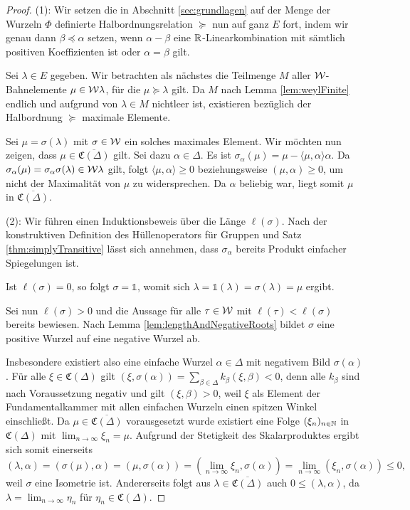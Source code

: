 \begin{proof}
  (1):
  Wir setzen die in Abschnitt \ref{sec:grundlagen} auf der Menge der Wurzeln $\Phi$ definierte Halb\-ordnungsrelation $\succeq$ nun auf ganz $E$ fort, indem wir genau dann $\beta \preceq \alpha$ setzen, wenn $\alpha - \beta$ eine $\mathbb{R}$-Linearkombination mit sämtlich positiven Koeffizienten ist oder $\alpha = \beta$ gilt.

  Sei $\lambda \in E$ gegeben. 
  Wir betrachten als nächstes die Teilmenge $M$ aller $\mathcal{W}$\hyp{}Bahnelemente $\mu \in \mathcal{W}\lambda$, für die $\mu \succeq \lambda$ gilt.
  Da $M$ nach Lemma \ref{lem:weylFinite} endlich und aufgrund von $\lambda \in M$ nichtleer ist, existieren bezüglich der Halbordnung $\succeq$ maximale Elemente.

  Sei $\mu = \sigma(\lambda)$ mit $\sigma \in \mathcal{W}$ ein solches maximales Element.
  Wir möchten nun zeigen, dass $\mu \in \overline{\mathfrak{C}(\Delta)}$ gilt.
  Sei dazu $\alpha \in \Delta$.
  Es ist $\sigma_\alpha(\mu) = \mu - \langle \mu, \alpha \rangle \alpha$.
  Da $\sigma_\alpha(\mu) = \sigma_\alpha \sigma (\lambda) \in \mathcal{W}\lambda$ gilt, folgt $\langle \mu, \alpha \rangle \geq 0$ beziehungsweise $(\mu,\alpha) \geq 0$, um nicht der Maximalität von $\mu$ zu widersprechen.
  Da $\alpha$ beliebig war, liegt somit $\mu$ in $\overline{\mathfrak{C}(\Delta)}$.

  (2):
  Wir führen einen Induktionsbeweis über die Länge $\ell(\sigma)$.
  Nach der konstruktiven Definition des Hüllenoperators für Gruppen und Satz \ref{thm:simplyTransitive} lässt sich annehmen, dass $\sigma_\alpha$ bereits Produkt einfacher Spiegelungen ist.

  Ist $\ell(\sigma) = 0$, so folgt $\sigma = \mathds{1}$, womit sich $\lambda = \mathds{1}(\lambda) = \sigma(\lambda) = \mu$ ergibt.

  Sei nun $\ell(\sigma) > 0$ und die Aussage für alle $\tau \in \mathcal{W}$ mit $\ell(\tau) < \ell(\sigma)$ bereits bewiesen.
  Nach Lemma \ref{lem:lengthAndNegativeRoots} bildet $\sigma$ eine positive Wurzel auf eine negative Wurzel ab.
  
  Insbesondere existiert also eine einfache Wurzel $\alpha \in \Delta$ mit negativem Bild $\sigma(\alpha)$.
  Für alle $\xi \in \mathfrak{C}(\Delta)$ gilt $(\xi, \sigma(\alpha)) = \sum_{\beta \in \Delta} k_\beta (\xi,\beta) < 0$, denn alle $k_\beta$ sind nach Voraussetzung negativ und gilt $(\xi,\beta) > 0$, weil $\xi$ als Element der Fundamentalkammer mit allen einfachen Wurzeln einen spitzen Winkel einschließt.
  Da $\mu \in \overline{\mathfrak{C}(\Delta)}$ vorausgesetzt wurde existiert eine Folge $(\xi_n)_{n \in \mathbb{N}}$ in $\mathfrak{C}(\Delta)$ mit $\lim_{n \to \infty} \xi_n = \mu$.
  Aufgrund der Stetigkeit des Skalarproduktes ergibt sich somit einerseits
  \begin{displaymath}
    (\lambda,\alpha)
    = (\sigma(\mu),\alpha)
    = (\mu, \sigma(\alpha)) 
    = (\lim_{n \to \infty} \xi_n, \sigma(\alpha)) 
    = \lim_{n \to \infty} ( \xi_n, \sigma(\alpha)) \leq 0,
  \end{displaymath}
  weil $\sigma$ eine Isometrie ist.
  Andererseits folgt aus $\lambda \in \overline{\mathfrak{C}(\Delta)}$ auch $0 \leq (\lambda,\alpha)$, da $\lambda = \lim_{n \to \infty} \eta_n$ für $\eta_n \in \mathfrak{C}(\Delta)$.


\end{proof}
